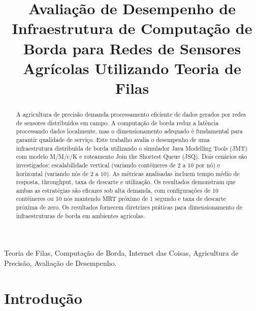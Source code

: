 \documentclass[conference]{IEEEtran}
\begin{document}
\title{Avaliação de Desempenho de Infraestrutura de Computação de Borda para Redes de Sensores Agrícolas Utilizando Teoria de Filas\\
}




\author{%
}

\maketitle



\begin{abstract}
A agricultura de precisão demanda processamento eficiente de dados gerados por redes de sensores distribuídos em campo. A computação de borda reduz a latência processando dados localmente, mas o dimensionamento adequado é fundamental para garantir qualidade de serviço. Este trabalho avalia o desempenho de uma infraestrutura distribuída de borda utilizando o simulador Java Modelling Tools (JMT) com modelo M/M/c/K e roteamento Join the Shortest Queue (JSQ). Dois cenários são investigados: escalabilidade vertical (variando contêineres de 2 a 10 por nó) e horizontal (variando nós de 2 a 10). As métricas analisadas incluem tempo médio de resposta, throughput, taxa de descarte e utilização. Os resultados demonstram que ambas as estratégias são eficazes sob alta demanda, com configurações de 10 contêineres ou 10 nós mantendo MRT próximo de 1 segundo e taxa de descarte próxima de zero. Os resultados fornecem diretrizes práticas para dimensionamento de infraestruturas de borda em ambientes agrícolas.
\end{abstract}

\begin{IEEEkeywords}
Teoria de Filas, Computação de Borda, Internet das Coisas, Agricultura de Precisão, Avaliação de Desempenho.
\end{IEEEkeywords}

\section{Introdução}
\end{document}
